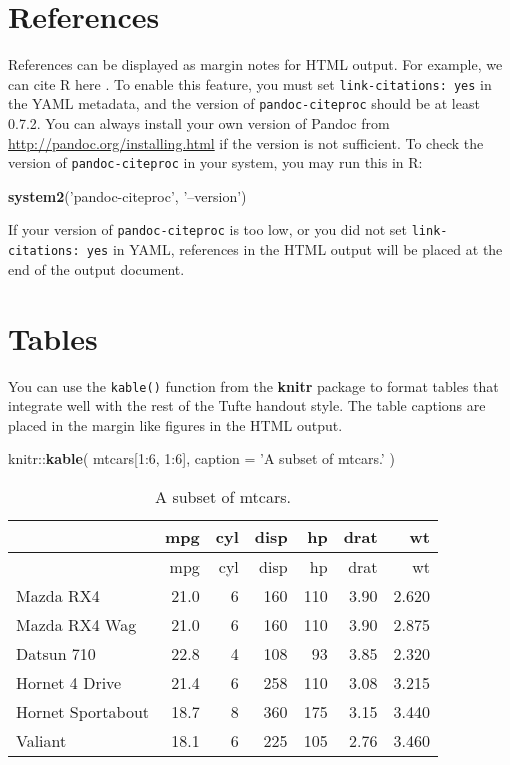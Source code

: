 \documentclass[]{tufte-handout}
\newenvironment{Shaded}{}{}
\newcommand{\KeywordTok}[1]{\textcolor[rgb]{0.00,0.44,0.13}{\textbf{{#1}}}}
\newcommand{\DataTypeTok}[1]{\textcolor[rgb]{0.56,0.13,0.00}{{#1}}}
\newcommand{\DecValTok}[1]{\textcolor[rgb]{0.25,0.63,0.44}{{#1}}}
\newcommand{\StringTok}[1]{\textcolor[rgb]{0.25,0.44,0.63}{{#1}}}
\newcommand{\NormalTok}[1]{{#1}}
\begin{document}
\section{References}\label{references}

References can be displayed as margin notes for HTML output. For
example, we can cite R here \citep{R-base}. To enable this feature, you
must set \texttt{link-citations: yes} in the YAML metadata, and the
version of \texttt{pandoc-citeproc} should be at least 0.7.2. You can
always install your own version of Pandoc from
\url{http://pandoc.org/installing.html} if the version is not
sufficient. To check the version of \texttt{pandoc-citeproc} in your
system, you may run this in R:

\begin{Shaded}
\begin{Highlighting}[]
\KeywordTok{system2}\NormalTok{(}\StringTok{'pandoc-citeproc'}\NormalTok{, }\StringTok{'--version'}\NormalTok{)}
\end{Highlighting}
\end{Shaded}

If your version of \texttt{pandoc-citeproc} is too low, or you did not
set \texttt{link-citations: yes} in YAML, references in the HTML output
will be placed at the end of the output document.

\section{Tables}\label{tables}

You can use the \texttt{kable()} function from the \textbf{knitr}
package to format tables that integrate well with the rest of the Tufte
handout style. The table captions are placed in the margin like figures
in the HTML output.

\begin{Shaded}
\begin{Highlighting}[]
\NormalTok{knitr::}\KeywordTok{kable}\NormalTok{(}
  \NormalTok{mtcars[}\DecValTok{1}\NormalTok{:}\DecValTok{6}\NormalTok{, }\DecValTok{1}\NormalTok{:}\DecValTok{6}\NormalTok{], }\DataTypeTok{caption =} \StringTok{'A subset of mtcars.'}
\NormalTok{)}
\end{Highlighting}
\end{Shaded}

\begin{longtable}[c]{@{}lrrrrrr@{}}
\caption{A subset of mtcars.}\tabularnewline
\toprule
& mpg & cyl & disp & hp & drat & wt\tabularnewline
\midrule
\endfirsthead
\toprule
& mpg & cyl & disp & hp & drat & wt\tabularnewline
\midrule
\endhead
Mazda RX4 & 21.0 & 6 & 160 & 110 & 3.90 & 2.620\tabularnewline
Mazda RX4 Wag & 21.0 & 6 & 160 & 110 & 3.90 & 2.875\tabularnewline
Datsun 710 & 22.8 & 4 & 108 & 93 & 3.85 & 2.320\tabularnewline
Hornet 4 Drive & 21.4 & 6 & 258 & 110 & 3.08 & 3.215\tabularnewline
Hornet Sportabout & 18.7 & 8 & 360 & 175 & 3.15 & 3.440\tabularnewline
Valiant & 18.1 & 6 & 225 & 105 & 2.76 & 3.460\tabularnewline
\bottomrule
\end{longtable}
\end{document}
